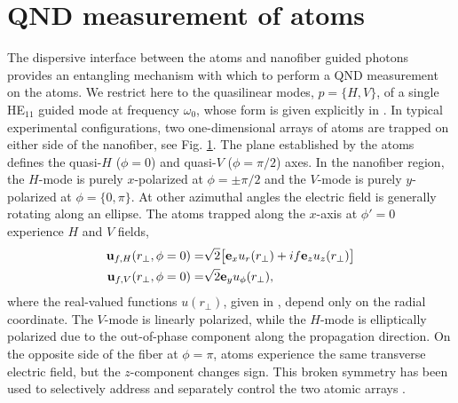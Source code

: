 \documentclass[preprint,aps,pra,onecolumn]{revtex4-1} %
\begin{document}
\section{QND measurement of atoms}
The dispersive interface between the atoms and nanofiber guided photons provides an entangling mechanism with which to perform a QND measurement on the atoms.  
We restrict here to the quasilinear modes, $p =\{H,V\}$, of a single HE$_{11}$ guided mode at frequency $\omega_0$, whose form is given explicitly in .  In typical experimental configurations, two one-dimensional arrays of atoms are trapped on either side of the nanofiber, see Fig. \ref{}. The plane established by the atoms defines the quasi-$H$ ($\phi = 0$) and quasi-$V$ ($\phi = \pi/2$) axes. In the nanofiber region, the $H$-mode is purely $x$-polarized at $\phi = \pm \pi/2$ and the $V$-mode is purely $y$-polarized at $\phi = \{0,\pi\}$.  At other azimuthal angles the electric field is generally rotating along an ellipse.  The atoms trapped along the $x$-axis at $\phi'=0$ experience $H$ and $V$ fields,
	\begin{align}
		\mathbf{u}_{f,H}(r_\perp, \phi = 0) = & \sqrt{2} \big[ \mathbf{e}_x u_r(r_\perp)+  if \mathbf{e}_z  u_z(r_\perp) \big] \\
		\mathbf{u}_{f,V}(r_\perp, \phi = 0) = & \sqrt{2} \mathbf{e}_y u_\phi(r_\perp), 
	\end{align}
where the real-valued functions $u(r_\perp)$, given in , depend only on the radial coordinate.  The $V$-mode is linearly polarized, while the $H$-mode is elliptically polarized due to the out-of-phase component along the propagation direction.  On the opposite side of the fiber at $\phi = \pi$, atoms experience the same transverse electric field, but the $z$-component changes sign.  This broken symmetry has been used to selectively address and separately control the two atomic arrays \cite{mitsch_exploiting_2014, mitsch_quantum_2014, sayrin_storage_2015}.  
\end{document}
